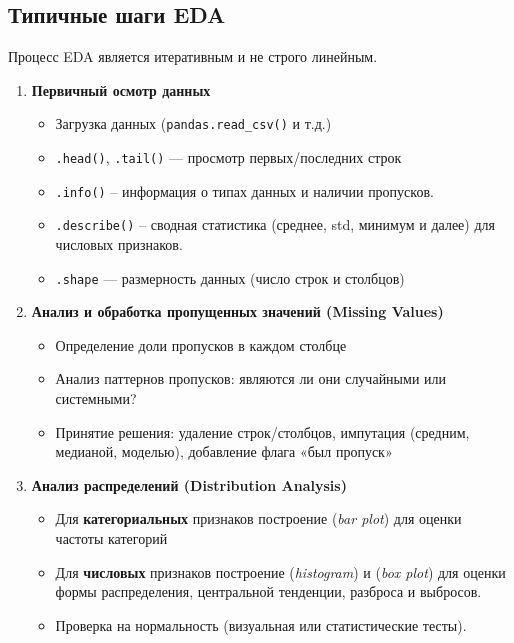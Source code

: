 \subsection{Типичные шаги EDA}

Процесс EDA является итеративным и не строго линейным.

\begin{enumerate}
    
    \item \textbf{Первичный осмотр данных}
    
    \begin{itemize}
        \item Загрузка данных (\texttt{pandas.read\_csv()} и т.д.)
        \item \texttt{.head()}, \texttt{.tail()} — просмотр первых/последних строк
        \item \texttt{.info()} -- информация о типах данных и наличии пропусков.
        \item \texttt{.describe()} -- сводная статистика (среднее, std, минимум и далее) для числовых признаков.
        \item \texttt{.shape} — размерность данных (число строк и столбцов)
    \end{itemize}
    
    \item \textbf{Анализ и обработка пропущенных значений (Missing Values)}
    
    \begin{itemize}
        \item Определение доли пропусков в каждом столбце
        \item Анализ паттернов пропусков: являются ли они случайными или системными?
        \item Принятие решения: удаление строк/столбцов, импутация (средним, медианой, моделью), добавление
        флага «был пропуск»
    \end{itemize}
    
    \item \textbf{Анализ распределений (Distribution Analysis)}
    
    \begin{itemize}
        \item Для \textbf{категориальных} признаков построение (\textit{bar plot}) для оценки частоты категорий
        \item Для \textbf{числовых} признаков построение (\textit{histogram}) и (\textit{box plot}) для оценки
        формы распределения, центральной тенденции, разброса и выбросов.
        \item Проверка на нормальность (визуальная или статистические тесты).
    \end{itemize}
    

\end{enumerate}
